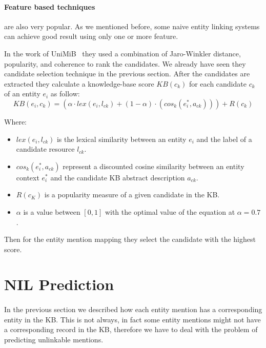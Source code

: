 \paragraph{Feature based techniques} are also very popular. As we mentioned before, some naive entity linking systems can achieve good result using only one or more feature.

In the work of UniMiB~\cite{caliano2016unimib} they used a combination of Jaro-Winkler distance, popularity, and  coherence to rank the candidates. We already have seen they candidate selection technique in the previous section. After the candidates are extracted they calculate a knowledge-base score $KB(c_k)$ for each candidate $c_k$ of an entity $e_i$ as follow: 
\begin{equation}
KB(e_i, c_k) = (\alpha \cdot lex(e_i, l_{ck}) + (1 - \alpha) \cdot (cos_k(e^{*}_{i}, a_{ck}))) + R(c_k)
\end{equation}


Where:

\begin{itemize}[noitemsep,  topsep=10pt]
\item $lex(e_i, l_{ck})$ is the lexical similarity between an entity $e_i$ and the label of a candidate resource $l_{ck}$.
\item $cos_k(e^{*}_{i}, a_{ck})$ represent a discounted cosine similarity between an entity context $e^{*}_{i}$ and the candidate KB abstract description $a_{ck}$.
\item $R(c_K)$ is a popularity measure of a given candidate in the KB.
\item $\alpha$ is a value between $[0, 1]$ with the optimal value of the equation at $\alpha = 0.7$.
\end{itemize}

Then for the entity mention mapping they select the candidate with the highest score.

\section{NIL Prediction}
\paragraph{}
In the previous section we described how each entity mention has a corresponding entity in the KB. This is not always, in fact some entity mentions might not have a corresponding record in the KB, therefore we have to deal with the problem of predicting unlinkable mentions.


